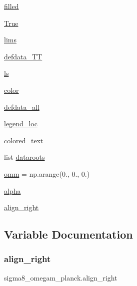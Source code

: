 \begin{DoxyCompactItemize}
\mbox{\hyperlink{namespacesigma8__omegam__planck_a200fb1b9a3ae7096a71586abdf77b5be}{filled}}
\item 
\mbox{\hyperlink{namespacesigma8__omegam__planck_ad94cbe65927705f57828db3e54fa2b81}{True}}
\item 
\mbox{\hyperlink{namespacesigma8__omegam__planck_af84d63b1134463218082717e48b074da}{lims}}
\item 
\mbox{\hyperlink{namespacesigma8__omegam__planck_ae0d13c2f466e473572179e6f43d378ee}{defdata\+\_\+\+TT}}
\item 
\mbox{\hyperlink{namespacesigma8__omegam__planck_aec754d31759c18aab34ea10f3e5f798e}{ls}}
\item 
\mbox{\hyperlink{namespacesigma8__omegam__planck_acbc1a1281def1d95105d19c2c61d2b8c}{color}}
\item 
\mbox{\hyperlink{namespacesigma8__omegam__planck_abf51dca99001c259d779032f0afc3ab4}{defdata\+\_\+all}}
\item 
\mbox{\hyperlink{namespacesigma8__omegam__planck_a787e5338c816c0aa6c3f683057c26d92}{legend\+\_\+loc}}
\item 
\mbox{\hyperlink{namespacesigma8__omegam__planck_ae572f6496c33d130feaf0019768c1eb8}{colored\+\_\+text}}
\item 
list \mbox{\hyperlink{namespacesigma8__omegam__planck_a682c275eb897a487989faec92b7d0de6}{dataroots}}
\item 
\mbox{\hyperlink{namespacesigma8__omegam__planck_a96436622e3d80be82d03f31e275d6173}{omm}} = np.\+arange(0., 0., 0.)
\item 
\mbox{\hyperlink{namespacesigma8__omegam__planck_ac787d2208268726fb17a0eee9f175e41}{alpha}}
\item 
\mbox{\hyperlink{namespacesigma8__omegam__planck_ac18d5c7cd71c204c472d2dd3df853d06}{align\+\_\+right}}
\end{DoxyCompactItemize}


\subsection{Variable Documentation}
\mbox{\label{namespacesigma8__omegam__planck_ac18d5c7cd71c204c472d2dd3df853d06}} 
\subsubsection{\texorpdfstring{align\+\_\+right}{align\_right}}
{\footnotesize\ttfamily sigma8\+\_\+omegam\+\_\+planck.\+align\+\_\+right}

